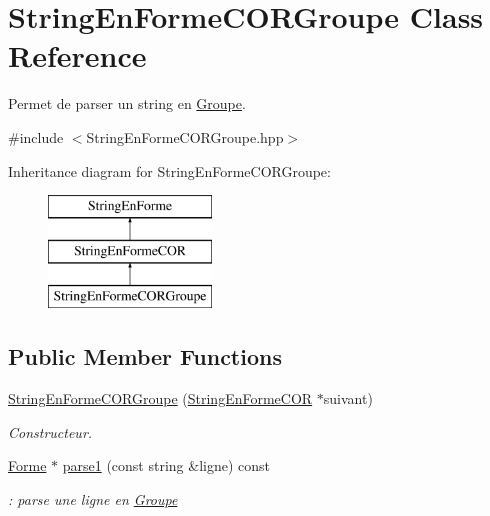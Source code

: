\hypertarget{class_string_en_forme_c_o_r_groupe}{}\section{String\+En\+Forme\+C\+O\+R\+Groupe Class Reference}
\label{class_string_en_forme_c_o_r_groupe}


Permet de parser un string en \mbox{\hyperlink{class_groupe}{Groupe}}.  




{\ttfamily \#include $<$String\+En\+Forme\+C\+O\+R\+Groupe.\+hpp$>$}

Inheritance diagram for String\+En\+Forme\+C\+O\+R\+Groupe\+:\begin{figure}[H]
\begin{center}
\leavevmode
\includegraphics[height=3.000000cm]{class_string_en_forme_c_o_r_groupe}
\end{center}
\end{figure}
\subsection*{Public Member Functions}
\begin{DoxyCompactItemize}
\item 
\mbox{\hyperlink{class_string_en_forme_c_o_r_groupe_a0680d95707cb01b8917f9f5ddaf3b2c5}{String\+En\+Forme\+C\+O\+R\+Groupe}} (\mbox{\hyperlink{class_string_en_forme_c_o_r}{String\+En\+Forme\+C\+OR}} $\ast$suivant)
\begin{DoxyCompactList}\small\item\em Constructeur. \end{DoxyCompactList}\item 
\mbox{\hyperlink{class_forme}{Forme}} $\ast$ \mbox{\hyperlink{class_string_en_forme_c_o_r_groupe_a1239a832ba17320a6b1e4a2e0fd66526}{parse1}} (const string \&ligne) const
\begin{DoxyCompactList}\small\item\em \+: parse une ligne en \mbox{\hyperlink{class_groupe}{Groupe}} \end{DoxyCompactList}\end{DoxyCompactItemize}


